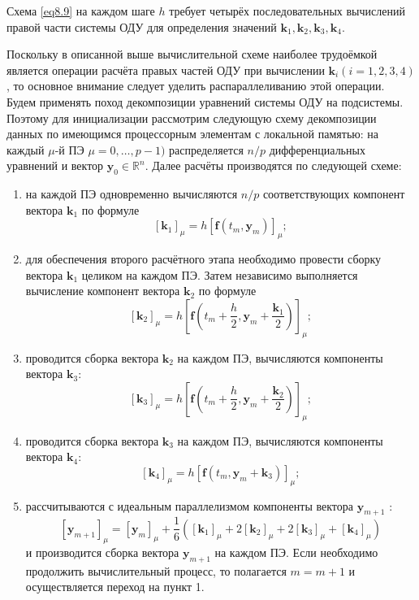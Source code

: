 \documentclass[14pt,final,titlepage,pscyr]{hedwork}
\renewcommand{\vec}[1]{\mathbf{#1}}
\begin{document}
	Схема \eqref{eq8.9} на каждом шаге \( h \) требует четырёх последовательных вычислений правой части 
	системы ОДУ для определения значений \( \vec{k}_1, \vec{k}_2, \vec{k}_3, \vec{k}_4 \).

	Поскольку в описанной выше вычислительной схеме наиболее трудоёмкой является операции расчёта правых 
	частей ОДУ при вычислении \( \vec{k}_i (i = 1, 2, 3, 4) \), то основное внимание следует уделить 
	распараллеливанию этой операции. Будем применять поход декомпозиции уравнений системы ОДУ на подсистемы. 
	Поэтому для инициализации рассмотрим следующую схему декомпозиции данных по имеющимся процессорным 
	элементам с локальной памятью: на каждый \( \mu \)-й ПЭ \( \mu = 0, \ldots, p - 1 ) \) распределяется 
	\( n/p \) дифференциальных уравнений и вектор \( \vec{y}_0 \in \mathbb{R}^n \). Далее расчёты 
	производятся по следующей схеме:
	\begin{enumerate}
		\item на каждой ПЭ одновременно вычисляются \( n/p \) соответствующих компонент вектора 
			\( \vec{k}_1 \) по формуле 
			\[ \left[ \vec{k}_1 \right]_\mu = h\left[ \vec{f}(t_m, \vec{y}_m) \right]_\mu; \]
		\item для обеспечения второго расчётного этапа необходимо провести сборку вектора \( \vec{k}_1 \) 
			целиком на каждом ПЭ. Затем независимо выполняется вычисление компонент вектора \( \vec{k}_2 \) 
			по формуле 
			\[ 
				\left[ \vec{k}_2 \right]_\mu = 
					h\left[ 
						\vec{f}(t_m + \frac{h}{2}, \vec{y}_m + \frac{\vec{k}_1}{2}) 
					\right]_\mu; 
			\]
		\item проводится сборка вектора \( \vec{k}_2 \) на каждом ПЭ, вычисляются компоненты вектора 
			\( \vec{k}_3 \): 
			\[ 
				\left[ \vec{k}_3 \right]_\mu = 
				h\left[ 
					\vec{f}(t_m + \frac{h}{2}, \vec{y}_m + \frac{\vec{k}_2}{2}) 
				\right]_\mu; 
			\]
		\item проводится сборка вектора \( \vec{k}_3 \) на каждом ПЭ, вычисляются компоненты вектора 
			\( \vec{k}_4 \):
			\[ \left[ \vec{k}_4 \right]_\mu = h\left[ \vec{f}(t_m, \vec{y}_m + \vec{k}_3 ) \right]_\mu; \]
		\item рассчитываются с идеальным параллелизмом компоненты вектора \( \vec{y}_{m+1} \) : 
			\[
				\left[ \vec{y}_{m+1} \right]_\mu = \left[ \vec{y}_m \right]_\mu + \frac{1}{6}\left( 
					\left[ \vec{k}_1 \right]_\mu + 2\left[ \vec{k}_2 \right]_\mu + 
					2\left[ \vec{k}_3 \right]_\mu + \left[ \vec{k}_4 \right]_\mu
				\right)
			\]
			и производится сборка вектора \( \vec{y}_{m+1} \) на каждом ПЭ. Если необходимо продолжить 
			вычислительный процесс, то полагается \( m = m + 1 \) и осуществляется переход на пункт 1.
	\end{enumerate}
\end{document}
